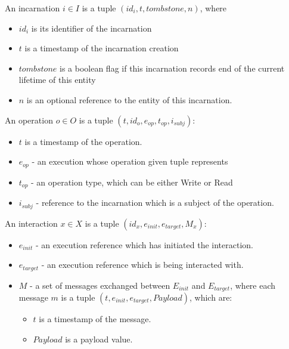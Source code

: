 \begin{definition}[Incarnation]
An incarnation $i \in I$ is a tuple $(id_i, t, tombstone, n)$, where
\begin{itemize}
	\item $id_{i}$ is its identifier of the incarnation
	\item $t$ is a timestamp of the incarnation creation
	\item $tombstone$ is a boolean flag if this incarnation records end of the current lifetime of this entity
	\item $n$ is an optional reference to the entity of this incarnation.
\end{itemize}
\end{definition}

\begin{definition}[Operation]
An operation $o \in O$ is a tuple $(t, id_o, e_{op}, t_{op}, i_{subj})$:
\begin{itemize}
	\item $t$ is a timestamp of the operation.
	\item $e_{op}$ - an execution whose operation given tuple represents
	\item $t_{op}$ - an operation type, which can be either Write or Read
	\item $i_{subj}$ - reference to the incarnation which is a subject of the operation.
\end{itemize}
\end{definition}

\begin{definition}[Interaction]
An interaction $x \in X$ is a tuple $(id_{x}, e_{init}, e_{target}, M_{x})$:
\begin{itemize}
	\item $e_{init}$ - an execution reference which has initiated the interaction.
	\item $e_{target}$ - an execution reference which is being interacted with.
	\item $M$ - a set of messages exchanged between $E_{init}$ and $E_{target}$, where each message $\textit{m}$ is a tuple $(t, e_{init}, e_{target}, \textit{Payload})$, which are:
    \begin{itemize}
	\item $t$ is a timestamp of the message.
	\item $Payload$ is a payload value.
    \end{itemize}
\end{itemize}
\end{definition}

